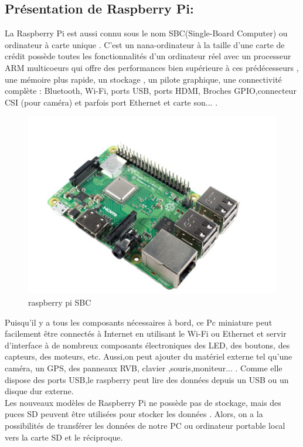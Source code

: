 \subsection{Présentation de  Raspberry Pi:}
La Raspberry Pi est aussi connu sous le nom SBC(Single-Board Computer) ou ordinateur à carte unique . C'est un nana-ordinateur à la taille d'une carte de crédit possède toutes les fonctionnalités d'un ordinateur réel avec un processeur ARM multicoeurs qui offre des  performances bien supérieure à ces prédécesseurs , une mémoire plus  rapide, un stockage , un pilote graphique, une connectivité complète : Bluetooth,  Wi-Fi, ports USB,  ports HDMI, Broches GPIO,connecteur CSI (pour caméra) et parfois port Ethernet et carte son...   .\\
\vspace{10pt}
\begin{figure}[H]
        \centering 
        \includegraphics{figures/chap3/raspberry.PNG}
         \caption{raspberry pi SBC}
\end{figure}        
\vspace{10pt}
Puisqu'il y a tous les composants nécessaires à bord, ce Pc miniature peut facilement être connectés à Internet en utilisant le Wi-Fi ou Ethernet  et servir d'interface à de nombreux composants électroniques des LED, des boutons, des capteurs, des moteurs, etc. 
Aussi,on peut  ajouter du matériel externe tel qu'une caméra, un GPS, des panneaux RVB, clavier ,souris,moniteur... .
Comme elle dispose des ports USB,le raspberry peut lire des données depuis un USB ou un disque dur externe.\\
\newline
Les nouveaux modèles de Raspberry Pi ne possède pas de stockage, mais des puces SD  peuvent être utilisées pour stocker les données . Alors, on a la possibilités de transférer les données de notre PC ou ordinateur portable local vers la carte SD et le réciproque.\\
